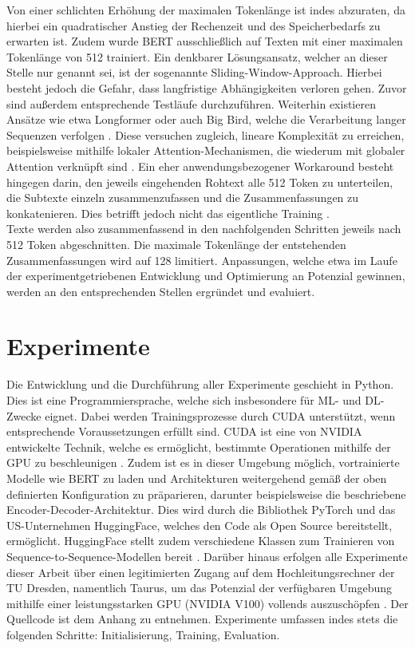 \noindent
Von einer schlichten Erhöhung der maximalen Tokenlänge ist indes abzuraten, da hierbei ein quadratischer Anstieg der Rechenzeit und des Speicherbedarfs zu erwarten ist. Zudem wurde \ac{BERT} ausschließlich auf Texten mit einer maximalen Tokenlänge von 512 trainiert. Ein denkbarer Lösungsansatz, welcher an dieser Stelle nur genannt sei, ist der sogenannte Sliding-Window-Approach. Hierbei besteht jedoch die Gefahr, dass langfristige Abhängigkeiten verloren gehen. Zuvor sind außerdem entsprechende Testläufe durchzuführen. Weiterhin existieren Ansätze wie etwa Longformer oder auch Big Bird, welche die Verarbeitung langer Sequenzen verfolgen \cite{ZAH21}. Diese versuchen zugleich, lineare Komplexität zu erreichen, beispielsweise mithilfe lokaler Attention-Mechanismen, die wiederum mit globaler Attention verknüpft sind \cite{BEL20}. Ein eher anwendungsbezogener Workaround besteht hingegen darin, den jeweils eingehenden Rohtext alle 512 Token zu unterteilen, die Subtexte einzeln zusammenzufassen und die Zusammenfassungen zu konkatenieren. Dies betrifft jedoch nicht das eigentliche Training \cite[S.~2]{DIN20}.\\

\noindent
Texte werden also zusammenfassend in den nachfolgenden Schritten jeweils nach 512 Token abgeschnitten. Die maximale Tokenlänge der entstehenden Zusammenfassungen wird auf 128 limitiert. Anpassungen, welche etwa im Laufe der experimentgetriebenen Entwicklung und Optimierung an Potenzial gewinnen, werden an den entsprechenden Stellen ergründet und evaluiert.


\section{Experimente}
\noindent
Die Entwicklung und die Durchführung aller Experimente geschieht in Python. Dies ist eine Programmiersprache, welche sich insbesondere für \ac{ML}- und \ac{DL}-Zwecke eignet. Dabei werden Trainingsprozesse durch \ac{CUDA} unterstützt, wenn entsprechende Voraussetzungen erfüllt sind. \ac{CUDA} ist eine von NVIDIA entwickelte Technik, welche es ermöglicht, bestimmte Operationen mithilfe der GPU zu beschleunigen \cite{NVI21}. Zudem ist es in dieser Umgebung möglich, vortrainierte Modelle wie \ac{BERT} zu laden und Architekturen weitergehend gemäß der oben definierten Konfiguration zu präparieren, darunter beispielsweise die beschriebene Encoder-Decoder-Architektur. Dies wird durch die Bibliothek PyTorch und das US-Unternehmen HuggingFace, welches den Code als Open Source bereitstellt, ermöglicht. HuggingFace stellt zudem verschiedene Klassen zum Trainieren von Sequence-to-Sequence-Modellen bereit \cite{HUG21}. Darüber hinaus erfolgen alle Experimente dieser Arbeit über einen legitimierten Zugang auf dem Hochleitungsrechner der TU Dresden, namentlich Taurus, um das Potenzial der verfügbaren Umgebung mithilfe einer leistungsstarken GPU (NVIDIA V100) vollends auszuschöpfen \cite{ZIH21}. Der Quellcode ist dem Anhang zu entnehmen. Experimente umfassen indes stets die folgenden Schritte: Initialisierung, Training, Evaluation.\\

